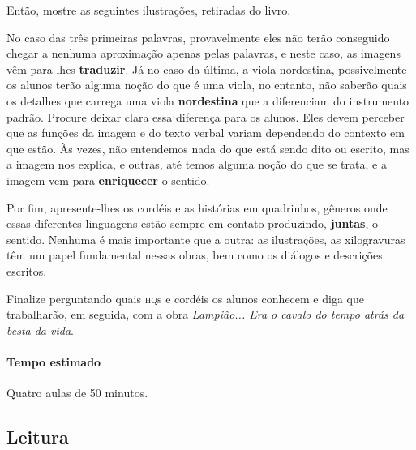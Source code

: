 \documentclass[11pt]{extarticle}
\begin{document}
Então, mostre as seguintes ilustrações, retiradas do livro.



No caso das três primeiras palavras, provavelmente eles não terão conseguido chegar
a nenhuma aproximação apenas pelas palavras, e neste caso, as imagens vêm para lhes 
\textbf{traduzir}. Já no caso da última, a viola nordestina, possivelmente os alunos 
terão alguma noção do que é uma viola, no entanto, não saberão quais os detalhes que 
carrega uma viola \textbf{nordestina} que a diferenciam do instrumento padrão. 
Procure deixar clara essa diferença para os alunos. Eles devem perceber que as funções
da imagem e do texto verbal variam dependendo do contexto em que estão. Às vezes, 
não entendemos nada do que está sendo dito ou escrito, mas a imagem nos explica,
e outras, até temos alguma noção do que se trata, e a imagem vem para \textbf{enriquecer}
o sentido. 


Por fim, apresente-lhes os cordéis e as histórias em quadrinhos, gêneros onde 
essas diferentes linguagens estão sempre em contato produzindo, \textbf{juntas},
o sentido. Nenhuma é mais importante que a outra: as ilustrações, as xilogravuras
têm um papel fundamental nessas obras, bem como os diálogos e descrições escritos.

Finalize perguntando quais \textsc{hq}s e cordéis os alunos conhecem e diga que trabalharão, em seguida,
com a obra \textit{Lampião... Era o cavalo do tempo atrás da besta da vida}.

\paragraph{Tempo estimado} Quatro aulas de 50 minutos.

\subsection{Leitura}

\end{document}
